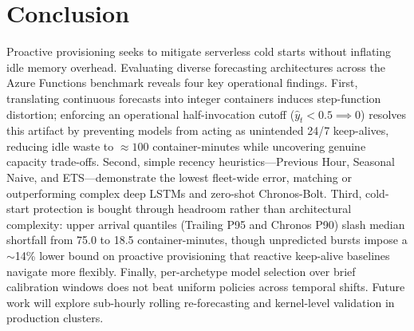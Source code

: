\documentclass[conference,a4paper]{IEEEtran}
\begin{document}
\section{Conclusion}
\label{sec:conclusion}
Proactive provisioning seeks to mitigate serverless cold starts without inflating idle memory overhead. Evaluating diverse forecasting architectures across the Azure Functions benchmark reveals four key operational findings. First, translating continuous forecasts into integer containers induces step-function distortion; enforcing an operational half-invocation cutoff ($\hat{y}_t < 0.5 \implies 0$) resolves this artifact by preventing models from acting as unintended 24/7 keep-alives, reducing idle waste to $\approx 100$ container-minutes while uncovering genuine capacity trade-offs. Second, simple recency heuristics---Previous Hour, Seasonal Naive, and ETS---demonstrate the lowest fleet-wide error, matching or outperforming complex deep LSTMs and zero-shot Chronos-Bolt. Third, cold-start protection is bought through headroom rather than architectural complexity: upper arrival quantiles (Trailing P95 and Chronos P90) slash median shortfall from 75.0 to 18.5 container-minutes, though unpredicted bursts impose a $\sim$14\% lower bound on proactive provisioning that reactive keep-alive baselines navigate more flexibly. Finally, per-archetype model selection over brief calibration windows does not beat uniform policies across temporal shifts. Future work will explore sub-hourly rolling re-forecasting and kernel-level validation in production clusters.



\end{document}
